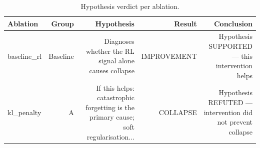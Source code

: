 \begin{table}[htbp]
\centering
\caption{Hypothesis verdict per ablation.}
\label{tab:hypothesis}
\begin{tabular}{lrrrr}
\toprule
\textbf{Ablation} & \textbf{Group} & \textbf{Hypothesis} & \textbf{Result} & \textbf{Conclusion} \\
\midrule
baseline_rl & Baseline & Diagnoses whether the RL signal alone causes collapse & IMPROVEMENT & Hypothesis SUPPORTED — this intervention helps \\
kl_penalty & A & If this helps: catastrophic forgetting is the primary cause; soft regularisation... & COLLAPSE & Hypothesis REFUTED — intervention did not prevent collapse \\
\bottomrule
\end{tabular}
\end{table}